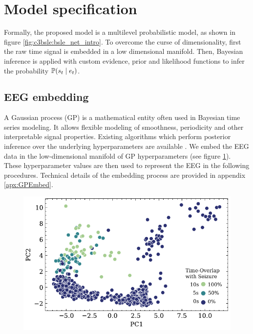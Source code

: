 

\section{Model specification}
Formally, the proposed model is a multilevel probabilistic model, as shown in figure \ref{fig:c3bsle:bsle_net_intro}. To overcome the curse of dimensionality, first the raw time signal is embedded in a low dimensional manifold. Then, Bayesian inference is applied with custom evidence, prior and likelihood functions to infer the probability $\mathbb{P}(s_t \mid e_t)$.




\subsection{EEG embedding}
\label{sec:c3bsle:embedding}
A Gaussian process (GP) is a mathematical entity often used in Bayesian time series modeling. It allows flexible modeling of smoothness, periodicity and other interpretable signal properties. Existing algorithms which perform posterior inference over the underlying hyperparameters are available \cite{rasmussen2003gaussian, gardner2018gpytorch}. We embed the EEG data in the low-dimensional manifold of GP hyperparameters (see figure \ref{fig:c3bsle:embeddings}). These hyperparameter values are then used to represent the EEG in the following procedures. Technical details of the embedding process are provided in appendix \ref{apx:GPEmbed}.

\begin{figure}[h]
      \includegraphics[width=\textwidth]{c3Bsle/Figs/embeddings/embeddings_double.pdf}
      \label{fig:c3bsle:embeddings}
\end{figure}


